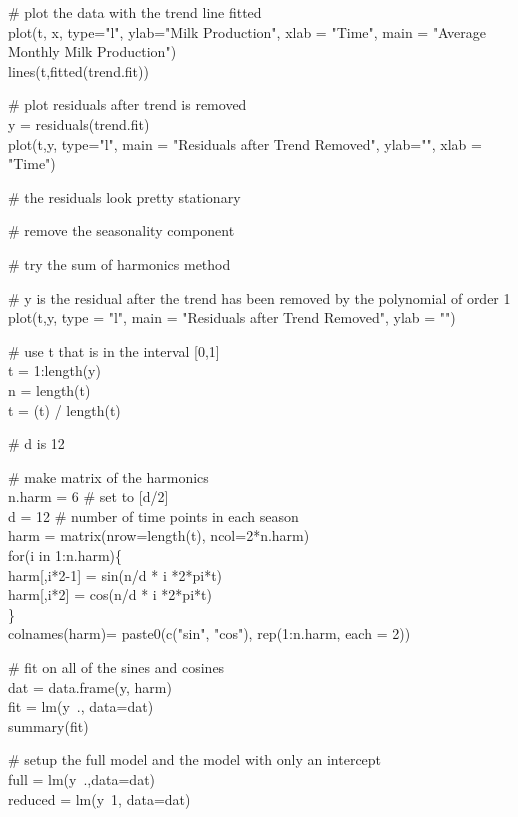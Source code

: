 \documentclass{article}
\begin{document}
\# plot the data with the trend line fitted \\
plot(t, x, type="l", ylab="Milk Production", xlab = "Time",
     main = "Average Monthly Milk Production") \\
lines(t,fitted(trend.fit))

\# plot residuals after trend is removed \\
y = residuals(trend.fit) \\
plot(t,y, type="l", main = "Residuals after Trend Removed", ylab="", xlab = "Time")

\# the residuals look pretty stationary


\# remove the seasonality component 

\# try the sum of harmonics method 

\# y is the residual after the trend has been removed by the polynomial of order 1 \\
plot(t,y, type = "l", main = "Residuals after Trend Removed", ylab = "")

\# use t that is in the interval [0,1] \\
t = 1:length(y) \\
n = length(t) \\
t = (t) / length(t)

\# d is 12

\# make matrix of the harmonics \\
n.harm = 6 \# set to [d/2] \\
d = 12 \# number of time points in each season \\
harm = matrix(nrow=length(t), ncol=2*n.harm) \\
for(i in 1:n.harm)\{ \\
  \indent harm[,i*2-1] = sin(n/d * i *2*pi*t) \\
  \indent harm[,i*2] = cos(n/d * i *2*pi*t) \\
 \indent\} \\
colnames(harm)= 
  paste0(c("sin", "cos"), rep(1:n.harm, each = 2))

\# fit on all of the sines and cosines \\
dat = data.frame(y, harm) \\ 
fit = lm(y~., data=dat) \\
summary(fit) 

\# setup the full model and the model with only an intercept \\
full = lm(y~.,data=dat) \\
reduced = lm(y~1, data=dat)
\end{document}
